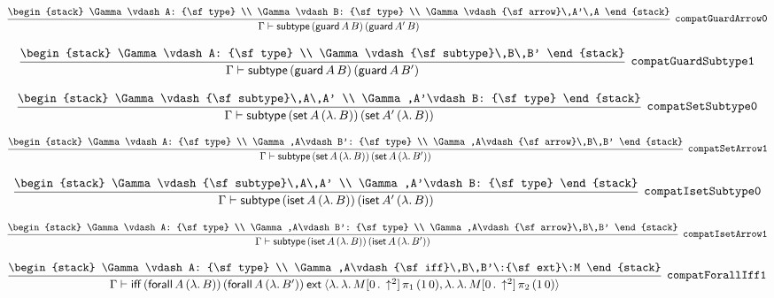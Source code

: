 \[
\infer[{\tt compatGuardArrow0}]{\Gamma \vdash {\sf subtype}\,({\sf guard}\,A\,B)\,({\sf guard}\,A'\,B)}{
\begin{stack}
\Gamma \vdash A: {\sf type}
\\
\Gamma \vdash B: {\sf type}
\\
\Gamma \vdash {\sf arrow}\,A'\,A
\end{stack}}
\]

\[
\infer[{\tt compatGuardSubtype1}]{\Gamma \vdash {\sf subtype}\,({\sf guard}\,A\,B)\,({\sf guard}\,A\,B')}{
\begin{stack}
\Gamma \vdash A: {\sf type}
\\
\Gamma \vdash {\sf subtype}\,B\,B'
\end{stack}}
\]

\[
\infer[{\tt compatSetSubtype0}]{\Gamma \vdash {\sf subtype}\,({\sf set}\,A\,(\lambda .\,B))\,({\sf set}\,A'\,(\lambda .\,B))}{
\begin{stack}
\Gamma \vdash {\sf subtype}\,A\,A'
\\
\Gamma ,A'\vdash B: {\sf type}
\end{stack}}
\]

\[
\infer[{\tt compatSetArrow1}]{\Gamma \vdash {\sf subtype}\,({\sf set}\,A\,(\lambda .\,B))\,({\sf set}\,A\,(\lambda .\,B'))}{
\begin{stack}
\Gamma \vdash A: {\sf type}
\\
\Gamma ,A\vdash B': {\sf type}
\\
\Gamma ,A\vdash {\sf arrow}\,B\,B'
\end{stack}}
\]

\[
\infer[{\tt compatIsetSubtype0}]{\Gamma \vdash {\sf subtype}\,({\sf iset}\,A\,(\lambda .\,B))\,({\sf iset}\,A'\,(\lambda .\,B))}{
\begin{stack}
\Gamma \vdash {\sf subtype}\,A\,A'
\\
\Gamma ,A'\vdash B: {\sf type}
\end{stack}}
\]

\[
\infer[{\tt compatIsetArrow1}]{\Gamma \vdash {\sf subtype}\,({\sf iset}\,A\,(\lambda .\,B))\,({\sf iset}\,A\,(\lambda .\,B'))}{
\begin{stack}
\Gamma \vdash A: {\sf type}
\\
\Gamma ,A\vdash B': {\sf type}
\\
\Gamma ,A\vdash {\sf arrow}\,B\,B'
\end{stack}}
\]

\[
\infer[{\tt compatForallIff1}]{\Gamma \vdash {\sf iff}\,({\sf forall}\,A\,(\lambda .\,B))\,({\sf forall}\,A\,(\lambda .\,B'))\:{\sf ext}\:\langle \lambda .\,\lambda .\,M[0\,.\,\uparrow^2]\, \pi_1\,(1\,0),\lambda .\,\lambda .\,M[0\,.\,\uparrow^2]\, \pi_2\,(1\,0)\rangle }{
\begin{stack}
\Gamma \vdash A: {\sf type}
\\
\Gamma ,A\vdash {\sf iff}\,B\,B'\:{\sf ext}\:M
\end{stack}}
\]

